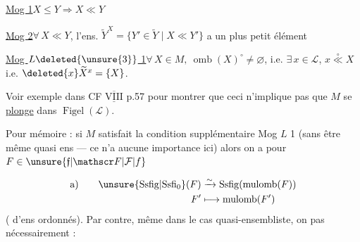 \uline{Mog 1}\quad $X\leq Y\Longrightarrow X\ll Y$

\uline{Mog 2}\quad $\forall\,X\ll Y$, l'ens. $\widetilde Y^X=\{Y'\in\widetilde Y\mid X\ll Y'\}$ a un plus petit élément

\uline{Mog $L\deleted{\unsure{3}}$ 1}\quad $\forall\,X\in M,\ \operatorname{omb}(X)^\circ\neq\varnothing$, i.e. $\exists\,x\in\mathscr L$,  $x\overset{\circ}{\ll}X$ i.e. $\deleted{x}\widetilde X^x=\{X\}$.

Voir exemple dans CF $\underline{\overline{\mathrm{VIII}}}$ p.57 pour montrer que ceci n'implique pas que $M$ se \uline{plonge} dans $\operatorname{Figel}(\mathscr L)$.


Pour mémoire : si $M$ satisfait la condition supplémentaire Mog $L$ 1 (sans être même quasi ens --- ce n'a aucune importance  ici) alors on a pour $F\in\unsure{\mathfrak f|\mathscr F|\mathcal F|f}$

\[
\begin{aligned}
\text{a)}\qquad\unsure{\mathrm{Ssfig}|\mathrm{Ssfi}_0}(F)&\xrightarrow{\sim}\mathrm{Ssfig}(\operatorname{mulomb}(F))\\
F'&\longmapsto\operatorname{mulomb}(F')
\end{aligned}
\]
( d'ens ordonnés). Par contre, même dans le cas quasi-ensembliste, on  pas nécessairement :
